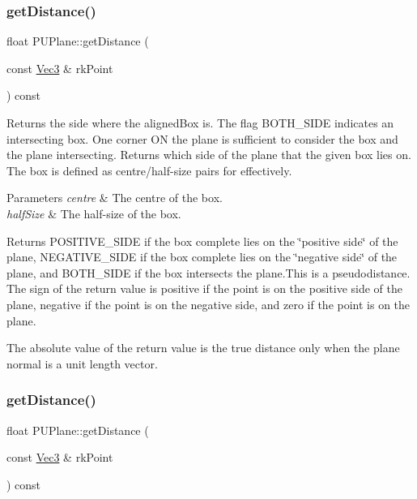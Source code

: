 \subsubsection{\texorpdfstring{get\+Distance()}{getDistance()}\hspace{0.1cm}{\footnotesize\ttfamily [1/2]}}
{\footnotesize\ttfamily float P\+U\+Plane\+::get\+Distance (\begin{DoxyParamCaption}\item[{const \hyperlink{classVec3}{Vec3} \&}]{rk\+Point }\end{DoxyParamCaption}) const}

Returns the side where the aligned\+Box is. The flag B\+O\+T\+H\+\_\+\+S\+I\+DE indicates an intersecting box. One corner ON the plane is sufficient to consider the box and the plane intersecting. Returns which side of the plane that the given box lies on. The box is defined as centre/half-\/size pairs for effectively. 
\begin{DoxyParams}{Parameters}
{\em centre} & The centre of the box. \\
\hline
{\em half\+Size} & The half-\/size of the box. \\
\hline
\end{DoxyParams}
\begin{DoxyReturn}{Returns}
P\+O\+S\+I\+T\+I\+V\+E\+\_\+\+S\+I\+DE if the box complete lies on the \char`\"{}positive side\char`\"{} of the plane, N\+E\+G\+A\+T\+I\+V\+E\+\_\+\+S\+I\+DE if the box complete lies on the \char`\"{}negative side\char`\"{} of the plane, and B\+O\+T\+H\+\_\+\+S\+I\+DE if the box intersects the plane.\+This is a pseudodistance. The sign of the return value is positive if the point is on the positive side of the plane, negative if the point is on the negative side, and zero if the point is on the plane. 
\end{DoxyReturn}
\begin{DoxyParagraph}{}
The absolute value of the return value is the true distance only when the plane normal is a unit length vector. 
\end{DoxyParagraph}
\mbox{\label{classPUPlane_a8d46bb12b79dfa18db08e2a59776191e}} 
\subsubsection{\texorpdfstring{get\+Distance()}{getDistance()}\hspace{0.1cm}{\footnotesize\ttfamily [2/2]}}
{\footnotesize\ttfamily float P\+U\+Plane\+::get\+Distance (\begin{DoxyParamCaption}\item[{const \hyperlink{classVec3}{Vec3} \&}]{rk\+Point }\end{DoxyParamCaption}) const}

